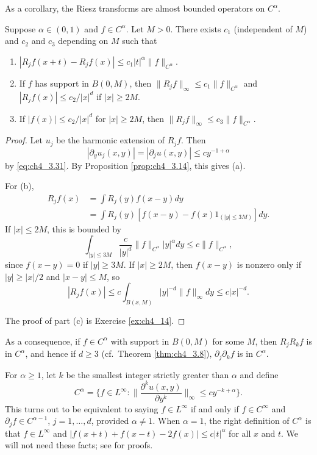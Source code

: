 As a corollary, the Riesz transforms are almost bounded operators on $C^\alpha$.

\begin{corollary}\label{cor:ch4_3.15}
Suppose $\alpha \in (0,1)$ and $f \in C^\alpha$. Let $M > 0$. There exists $c_1$ (independent of $M$) and $c_2$ and $c_3$ depending on $M$ such that
\begin{enumerate}
    \item $|R_j f(x+t)-R_j f(x)| \leq c_1|t|^\alpha\|f\|_{C^\alpha}$.
    \item If $f$ has support in $B(0,M)$, then $\|R_j f\|_\infty \leq c_1\|f\|_{C^\alpha}$ and $|R_j f(x)| \leq c_2/|x|^d$ if $|x| \geq 2M$.
    \item If $|f(x)| \leq c_2/|x|^d$ for $|x| \geq 2M$, then $\|R_j f\|_\infty \leq c_3\|f\|_{C^\alpha}$.
\end{enumerate}
\end{corollary}

\begin{proof}
Let $u_j$ be the harmonic extension of $R_j f$. Then
\[
    |\partial_y u_j(x,y)| = |\partial_j u(x,y)| \leq cy^{-1+\alpha}
\]
by \eqref{eq:ch4_3.31}. By Proposition \ref{prop:ch4_3.14}, this gives (a).

For (b),
\begin{align*}
    R_j f(x) &= \int R_j(y)f(x-y)dy \\
    &= \int R_j(y)[f(x-y)-f(x)1_{(|y|\leq 3M)}]dy.
\end{align*}
If $|x| \leq 2M$, this is bounded by
\[
    \int_{|y|\le 3M} \frac{c}{|y|^d}\|f\|_{C^\alpha}|y|^\alpha dy \leq c\|f\|_{C^\alpha},
\]
since $f(x-y) = 0$ if $|y| \geq 3M$. If $|x| \geq 2M$, then $f(x-y)$ is nonzero only if $|y| \geq |x|/2$ and $|x-y| \leq M$, so
\[
    |R_j f(x)| \leq c \int_{B(x,M)} |y|^{-d}\|f\|_\infty dy \leq c|x|^{-d}.
\]

The proof of part (c) is Exercise \ref{ex:ch4_14}.
\end{proof}

As a consequence, if $f \in C^\alpha$ with support in $B(0,M)$ for some $M$, then $R_j R_k f$ is in $C^\alpha$, and hence if $d \geq 3$ (cf.\ Theorem \ref{thm:ch4_3.8}), $\partial_j\partial_k f$ is in $C^\alpha$.

\mpagebreak

For $\alpha \geq 1$, let $k$ be the smallest integer strictly greater than $\alpha$ and define
\begin{equation}\label{eq:ch4_3.32}
    C^\alpha = \{f \in L^\infty : \Big\|\frac{\partial^k u(x,y)}{\partial y^k}\Big\|_\infty \leq cy^{-k+\alpha}\}.
\end{equation}
This turns out to be equivalent to saying $f \in L^\infty$ if and only if $f\in C^\infty$ and $\partial_j f \in C^{\alpha-1}$, $j=1,\ldots,d$, provided $\alpha \neq 1$. When $\alpha = 1$, the right definition of $C^\alpha$ is that $f \in L^\infty$ and $|f(x+t)+f(x-t)-2f(x)| \leq c|t|^\alpha$ for all $x$ and $t$. We will not need these facts; see \cite{Stein1970a} for proofs.

